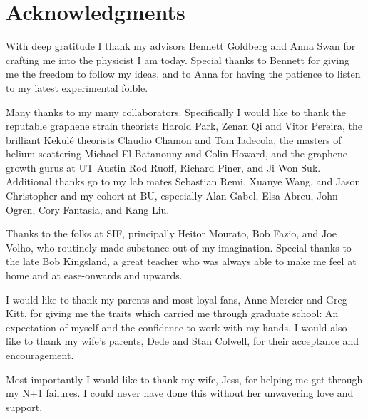 \chapter*{Acknowledgments}
With deep gratitude I thank my advisors Bennett Goldberg and Anna Swan for crafting me into the physicist I am today.
Special thanks to Bennett for giving me the freedom to follow my ideas, and to Anna for having the patience to listen to my latest experimental foible.

Many thanks to my many collaborators.
Specifically I would like to thank the reputable graphene strain theorists Harold Park, Zenan Qi and Vitor Pereira, the brilliant Kekul\'e theorists Claudio Chamon and Tom Iadecola, the masters of helium scattering Michael El-Batanouny and Colin Howard, and the graphene growth gurus at UT Austin Rod Ruoff, Richard Piner, and Ji Won Suk.
Additional thanks go to my lab mates Sebastian Remi, Xuanye Wang, and Jason Christopher and my cohort at BU, especially Alan Gabel, Elsa Abreu, John Ogren, Cory Fantasia, and Kang Liu.

Thanks to the folks at SIF, principally Heitor Mourato, Bob Fazio, and Joe Volho, who routinely made substance out of my imagination.
Special thanks to the late Bob Kingsland, a great teacher who was always able to make me feel at home and at ease-onwards and upwards.

I would like to thank my parents and most loyal fans, Anne Mercier and Greg Kitt, for giving me the traits which carried me through graduate school: An expectation of myself and the confidence to work with my hands.
I would also like to thank my wife's parents, Dede and Stan Colwell, for their acceptance and encouragement.

Most importantly I would like to thank my wife, Jess, for helping me get through my N+1 failures.
I could never have done this without her unwavering love and support.

\newpage